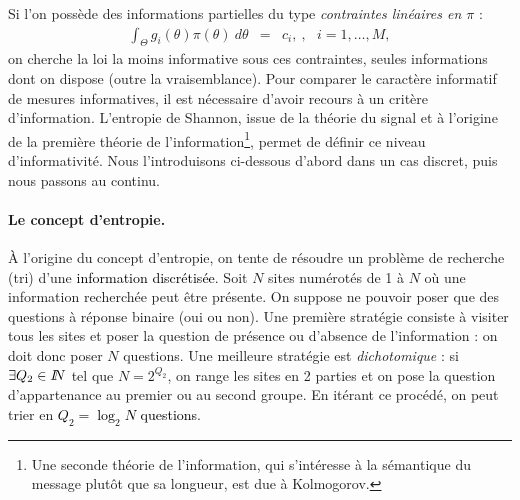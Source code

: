 Si l'on possède des informations partielles du type \emph{contraintes linéaires en $\pi$} : 
\begin{eqnarray*}
\int_{\Theta} g_i(\theta) \pi(\theta) \ d\theta & = & c_i, \ ,\ \ \ i=1,\ldots,M,
\end{eqnarray*}
on cherche la loi la moins informative sous ces contraintes, seules informations dont on dispose (outre la vraisemblance). Pour comparer le caractère informatif de mesures informatives, il est nécessaire d'avoir recours à un critère d'information. L'entropie de Shannon, issue de la théorie du signal et à l'origine de la première théorie de l'information\footnote{Une seconde théorie de l'information, qui s'intéresse à la sémantique du message plutôt que sa longueur, est due à Kolmogorov.}, permet de définir ce niveau d'informativité. Nous l'introduisons ci-dessous d'abord dans un cas discret, puis nous passons au continu. 

\paragraph{Le concept d'entropie.} \`A l'origine du concept d'entropie, on tente de résoudre un problème de recherche (tri) d'une \textcolor{black}{information discrétisée}.   Soit $N$ sites numérotés de 1 à $N$ où une information recherchée peut être présente. On suppose ne pouvoir poser que des questions à réponse binaire (oui ou non). Une première stratégie consiste à visiter tous les sites et poser la question de présence ou d'absence de l'information : on doit donc poser $N$ questions. Une meilleure stratégie est \emph{dichotomique} : si $\exists Q_2\in I\!\!N$ tel que $N=2^{Q_2}$, on range les sites en 2 parties et on pose la question d'appartenance au premier ou au second groupe. En itérant ce procédé, on peut trier en \textcolor{black}{ $Q_2=\log_2 N$ questions}. \\

